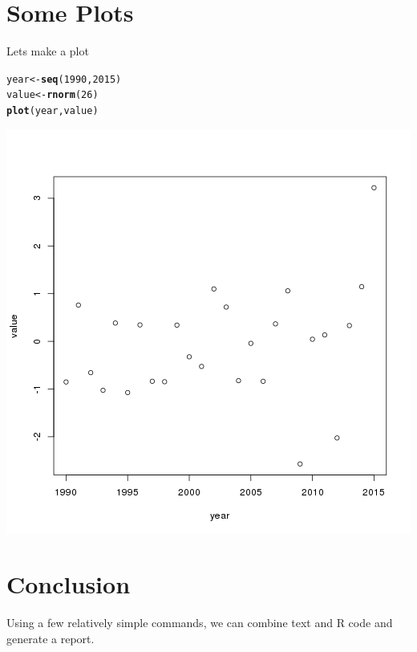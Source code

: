 \documentclass{article}\usepackage[]{graphicx}\usepackage[]{color}
\makeatletter
\def\maxwidth{ %
  \ifdim\Gin@nat@width>\linewidth
    \linewidth
  \else
    \Gin@nat@width
  \fi
}
\newcommand{\hlnum}[1]{\textcolor[rgb]{0.686,0.059,0.569}{#1}}%
\newcommand{\hlstd}[1]{\textcolor[rgb]{0.345,0.345,0.345}{#1}}%
\newcommand{\hlkwb}[1]{\textcolor[rgb]{0.69,0.353,0.396}{#1}}%
\newcommand{\hlkwd}[1]{\textcolor[rgb]{0.737,0.353,0.396}{\textbf{#1}}}%
\newenvironment{kframe}{%
 \def\at@end@of@kframe{}%
 \ifinner\ifhmode%
  \def\at@end@of@kframe{\end{minipage}}%
  \begin{minipage}{\columnwidth}%
 \fi\fi%
 \def\FrameCommand##1{\hskip\@totalleftmargin \hskip-\fboxsep
 \colorbox{shadecolor}{##1}\hskip-\fboxsep
     \hskip-\linewidth \hskip-\@totalleftmargin \hskip\columnwidth}%
 \MakeFramed {\advance\hsize-\width
   \@totalleftmargin\z@ \linewidth\hsize
   \@setminipage}}%
 {\par\unskip\endMakeFramed%
 \at@end@of@kframe}
\newenvironment{knitrout}{}{} %
\makeatother
\begin{document}
\section{Some Plots}
Lets make a plot

\begin{knitrout}
\color{fgcolor}\begin{kframe}
\begin{alltt}
\hlstd{year}\hlkwb{<-}\hlkwd{seq}\hlstd{(}\hlnum{1990}\hlstd{,}\hlnum{2015}\hlstd{)}
\hlstd{value}\hlkwb{<-}\hlkwd{rnorm}\hlstd{(}\hlnum{26}\hlstd{)}
\hlkwd{plot}\hlstd{(year,value)}
\end{alltt}
\end{kframe}
\includegraphics[width=\maxwidth]{figure/unnamed-chunk-4-1} 

\end{knitrout}



\section{Conclusion}
Using a few relatively simple commands, we can combine text and R code and generate a report.
\end{document}

